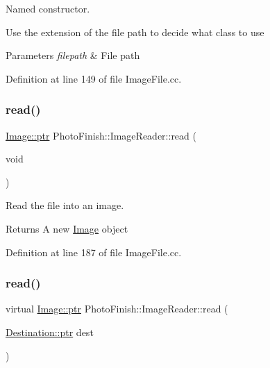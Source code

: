 Named constructor. 

Use the extension of the file path to decide what class to use 
\begin{DoxyParams}{Parameters}
{\em filepath} & File path \\
\hline
\end{DoxyParams}


Definition at line 149 of file Image\+File.\+cc.

\mbox{\label{class_photo_finish_1_1_image_reader_ad4c4ba4d84800ffe7e3d9f2150fc8ece}} 
\subsubsection{\texorpdfstring{read()}{read()}\hspace{0.1cm}{\footnotesize\ttfamily [1/2]}}
{\footnotesize\ttfamily \hyperlink{class_photo_finish_1_1_image_ab336203305ed3a1397d7245063353b5a}{Image\+::ptr} Photo\+Finish\+::\+Image\+Reader\+::read (\begin{DoxyParamCaption}\item[{void}]{ }\end{DoxyParamCaption})\hspace{0.3cm}{\ttfamily [virtual]}}



Read the file into an image. 

\begin{DoxyReturn}{Returns}
A new \hyperlink{class_photo_finish_1_1_image}{Image} object 
\end{DoxyReturn}


Definition at line 187 of file Image\+File.\+cc.

\mbox{\label{class_photo_finish_1_1_image_reader_a2911b61ef1a592e9d384fd4be8699948}} 
\subsubsection{\texorpdfstring{read()}{read()}\hspace{0.1cm}{\footnotesize\ttfamily [2/2]}}
{\footnotesize\ttfamily virtual \hyperlink{class_photo_finish_1_1_image_ab336203305ed3a1397d7245063353b5a}{Image\+::ptr} Photo\+Finish\+::\+Image\+Reader\+::read (\begin{DoxyParamCaption}\item[{\hyperlink{class_photo_finish_1_1_destination_a0d282a905cd81c3f0e6d7233c9bc7774}{Destination\+::ptr}}]{dest }\end{DoxyParamCaption})\hspace{0.3cm}{\ttfamily [pure virtual]}}



